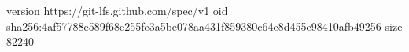 version https://git-lfs.github.com/spec/v1
oid sha256:4af57788e589f68e255fe3a5be078aa431f859380c64e8d455e98410afb49256
size 82240
